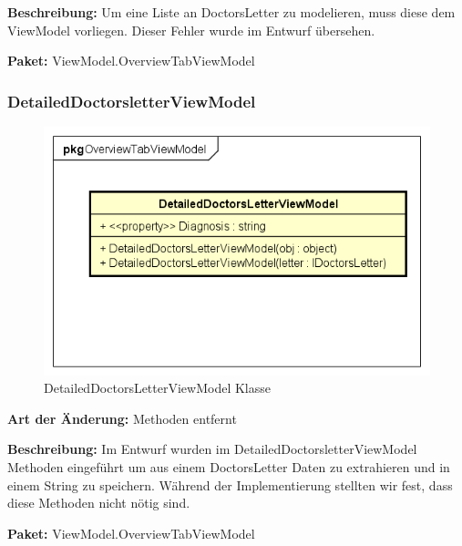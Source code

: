 \documentclass[a4paper]{scrreprt}
\begin{document}
\textbf{Beschreibung:} Um eine Liste an DoctorsLetter zu modelieren, muss diese dem ViewModel vorliegen. Dieser Fehler wurde im Entwurf übersehen. 

\textbf{Paket:} ViewModel.OverviewTabViewModel



\subsubsection{DetailedDoctorsletterViewModel}
\begin{figure}[H]
\centering
\includegraphics[width=0.45\textheight]{graphics/Klassendiagramme/ViewModel/DetailedDoctorsletterViewModel}
\caption{DetailedDoctorsLetterViewModel Klasse}
\end{figure}
\textbf{Art der Änderung:} Methoden entfernt

\textbf{Beschreibung:} Im Entwurf wurden im DetailedDoctorsletterViewModel Methoden eingeführt um aus einem DoctorsLetter Daten zu extrahieren und in einem String zu speichern. Während der Implementierung stellten wir fest, dass diese Methoden nicht nötig sind. 

\textbf{Paket:} ViewModel.OverviewTabViewModel
\end{document}
